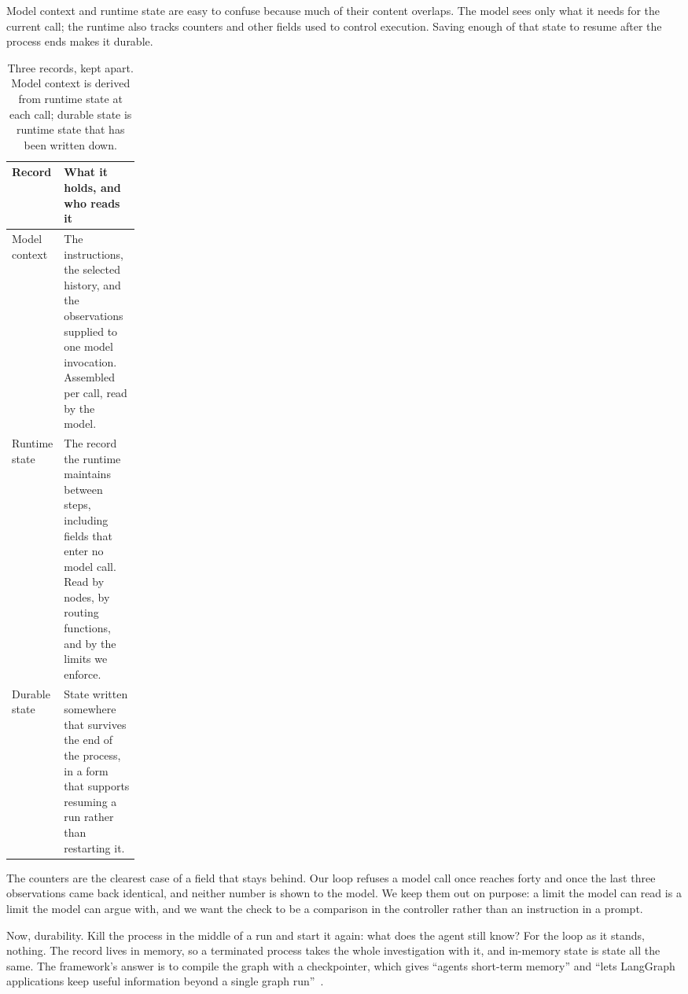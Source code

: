 Model context and runtime state are easy to confuse because much of their content overlaps.
The model sees only what it needs for the current call; the runtime also tracks counters and other
fields used to control execution. Saving enough of that state to resume after the process ends
makes it durable.

\begin{table}[htbp]
  \centering
  \begin{tabularx}{\linewidth}{@{}p{0.19\linewidth}X@{}}
    \toprule
    \textbf{Record} & \textbf{What it holds, and who reads it} \\
    \midrule
    Model context & The instructions, the selected history, and the observations supplied to one
    model invocation. Assembled per call, read by the model. \\
    Runtime state & The record the runtime maintains between steps, including fields that enter
    no model call. Read by nodes, by routing functions, and by the limits we enforce. \\
    Durable state & State written somewhere that survives the end of the process, in a form that
    supports resuming a run rather than restarting it. \\
    \bottomrule
  \end{tabularx}
  \caption{Three records, kept apart. Model context is derived from runtime state at each call;
  durable state is runtime state that has been written down.}
  \label{tab:state-three}
\end{table}

The counters are the clearest case of a field that stays behind. Our loop refuses a model call once
 reaches forty and once the last three observations came back identical, and
neither number is shown to the model. We keep them out on purpose: a limit the model can read is a
limit the model can argue with, and we want the check to be a comparison in the controller rather
than an instruction in a prompt.

Now, durability. Kill the process in the middle of a run and start it again: what does the agent
still know? For the loop as it stands, nothing. The record lives in memory, so a terminated process
takes the whole investigation with it, and in-memory state is state all the same. The framework's
answer is to compile the graph with a checkpointer, which gives ``agents short-term memory'' and
``lets LangGraph applications keep useful information beyond a single graph
run''~\citep{langgraph-persistence}.

